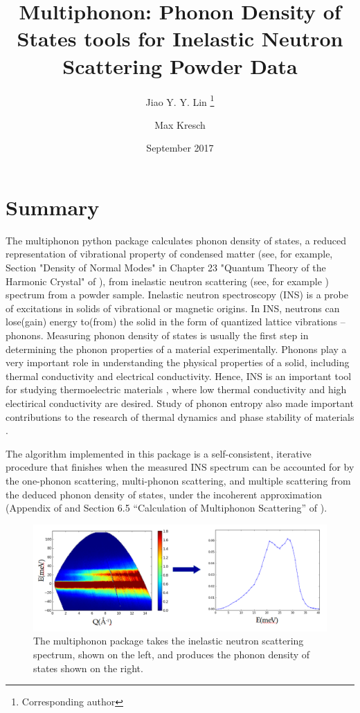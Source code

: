 \documentclass{article}
\title{Multiphonon: Phonon Density of States tools for Inelastic Neutron Scattering Powder Data}
\author[1]{Jiao Y. Y. Lin \thanks{Corresponding author}}
\author[2]{Max Kresch}
\affil[1]{linjiao@ornl.gov, Neutron Data Analysis and Visualization Division, Oak Ridge National Lab}
\affil[2]{mkresch@gmail.com}
\date{September 2017}
\begin{document}
\maketitle

\section{Summary}\label{summary}

The multiphonon python package calculates phonon density of states,
a reduced representation of vibrational property of condensed matter (see, for example,
Section "Density of Normal Modes" in
Chapter 23 "Quantum Theory of the Harmonic Crystal" of \cite{ashcroftmermin}),
from
inelastic neutron scattering (see, for example \cite{FultzINSbook})
spectrum from a powder sample.
Inelastic neutron spectroscopy (INS) is a probe of excitations in solids of
vibrational or magnetic origins.
In INS, neutrons can lose(gain) energy 
to(from) the solid in the form of quantized lattice vibrations -- phonons.
Measuring phonon density of states is usually the first step
in determining the phonon properties of a material experimentally.
Phonons play a very important role in understanding the physical properties of a solid,
including thermal conductivity and electrical conductivity.
Hence, INS is an important tool for studying thermoelectric materials \cite{budai2014, lichen2015},
where
low thermal conductivity and high electirical conductivity are desired.
Study of phonon entropy also made important contributions to
the research of thermal dynamics and phase stability of materials
\cite{FULTZ2010, bogdanoff2002phonon, swan2006vibrational}.

The algorithm implemented in this package is a self-consistent,
iterative procedure that finishes when
the measured INS spectrum can be accounted for by
the one-phonon scattering, multi-phonon scattering, and multiple
scattering from the deduced phonon density of states, under the
incoherent approximation (Appendix of \cite{KreschNickel2007} and
Section 6.5 ``Calculation of Multiphonon Scattering'' of
\cite{FultzINSbook}).

\begin{figure}
  \includegraphics[scale=0.25]{sqe2dos}
  \caption{The multiphonon package takes the inelastic neutron scattering spectrum, shown on the left, and produces the phonon density of states shown on the right.}
\end{figure}
\end{document}
